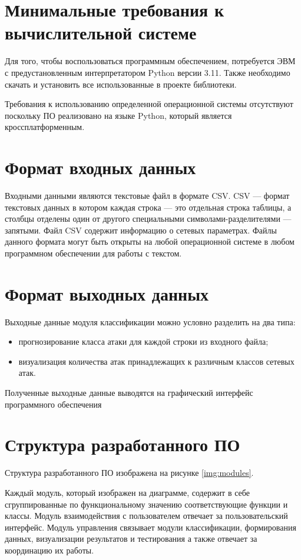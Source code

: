 \section{Минимальные требования к вычислительной системе}
Для того, чтобы воспользоваться программным обеспечением, потребуется
ЭВМ с предустановленным интерпретатором Python версии 3.11. Также необходимо
скачать и установить все использованные в проекте библиотеки.

Требования к использованию определенной операционной системы отсутствуют поскольку  ПО реализовано на языке Python,
который является кроссплатформенным.


\section{Формат входных данных}
Входными данными являются текстовые файл в формате CSV.
CSV --- формат текстовых данных в котором каждая строка --- это отдельная строка таблицы, а столбцы
отделены один от другого специальными символами-разделителями --- запятыми.
Файл CSV содержит информацию о сетевых параметрах.
Файлы данного формата могут быть открыты на любой операционной системе в
любом программном обеспечении для работы с текстом.

\section{Формат выходных данных}

Выходные данные модуля классификации можно условно разделить на два
типа:
    \begin{itemize}
        \item прогнозирование класса атаки для каждой строки из входного файла;
        \item визуализация количества атак принадлежащих к различным классов сетевых атак.
    \end{itemize}
Полученные выходные данные выводятся на графический интерфейс
программного обеспечения


\section{Структура разработанного ПО}
Структура разработанного ПО изображена на рисунке \ref*{img:modules}.


Каждый модуль, который изображен на диаграмме, содержит в себе
сгруппированные по функциональному значению соответствующие функции и классы.
Модуль взаимодействия с пользователем отвечает за пользовательский
интерфейс. Модуль управления связывает модули классификации, формирования данных, визуализации результатов и тестирования
а также отвечает за координацию их работы.


